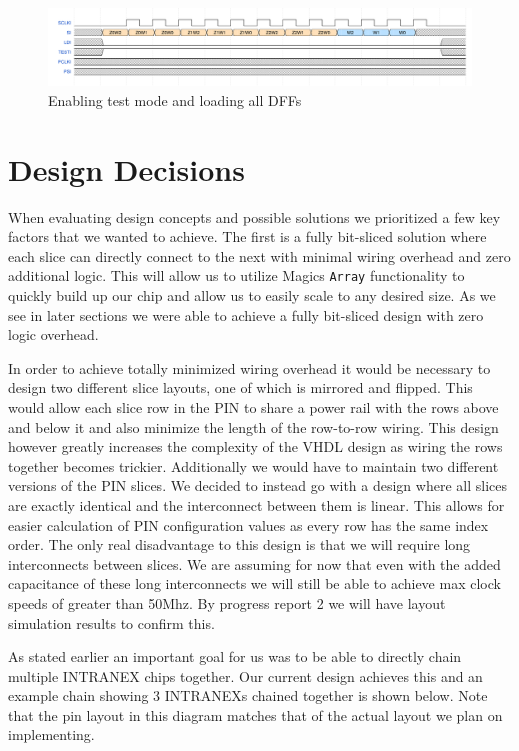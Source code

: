 \documentclass{article}
\begin{document}
\begin{figure}[H]
    \centering
    \includegraphics[width=\linewidth]{../waveforms/test.png}
    \caption{Enabling test mode and loading all DFFs}
\end{figure}

\section{Design Decisions}

When evaluating design concepts and possible solutions we prioritized a few key
factors that we wanted to achieve. The first is a fully bit-sliced solution
where each slice can directly connect to the next with minimal wiring overhead
and zero additional logic. This will allow us to utilize Magics \texttt{Array}
functionality to quickly build up our chip and allow us to easily scale to any
desired size. As we see in later sections we were able to achieve a fully
bit-sliced design with zero logic overhead.

In order to achieve totally minimized wiring overhead it would be necessary to
design two different slice layouts, one of which is mirrored and flipped. This
would allow each slice row in the PIN to share a power rail with the rows above
and below it and also minimize the length of the row-to-row wiring. This design
however greatly increases the complexity of the VHDL design as wiring the rows
together becomes trickier. Additionally we would have to maintain two different
versions of the PIN slices. We decided to instead go with a design where all
slices are exactly identical and the interconnect between them is linear. This
allows for easier calculation of PIN configuration values as every row has the
same index order.  The only real disadvantage to this design is that we will
require long interconnects between slices. We are assuming for now that even
with the added capacitance of these long interconnects we will still be able to
achieve max clock speeds of greater than 50Mhz. By progress report 2 we will
have layout simulation results to confirm this.

As stated earlier an important goal for us was to be able to directly chain
multiple INTRANEX chips together. Our current design achieves this and an
example chain showing 3 INTRANEXs chained together is shown below. Note that
the pin layout in this diagram matches that of the actual layout we plan on
implementing.
\end{document}
